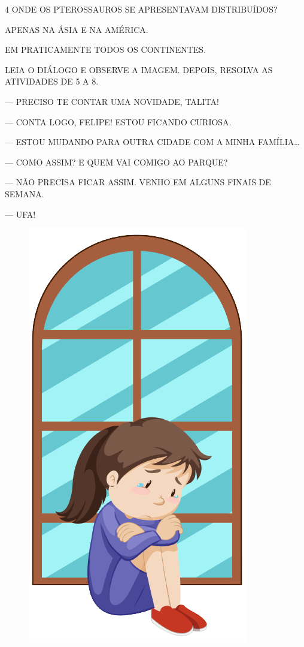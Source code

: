 \num{4} ONDE OS PTEROSSAUROS SE APRESENTAVAM DISTRIBUÍDOS?

\begin{boxlist}
 APENAS NA ÁSIA E NA AMÉRICA.

 EM PRATICAMENTE TODOS OS CONTINENTES.
\end{boxlist}

LEIA O DIÁLOGO E OBSERVE A IMAGEM. DEPOIS, RESOLVA
AS ATIVIDADES DE 5 A 8.



\begin{minipage}{.7\textwidth}
\begin{myquote}
--- PRECISO TE CONTAR UMA NOVIDADE, TALITA!

--- CONTA LOGO, FELIPE! ESTOU FICANDO CURIOSA.

--- ESTOU MUDANDO PARA OUTRA CIDADE COM A MINHA FAMÍLIA\ldots{}

--- COMO ASSIM? E QUEM VAI COMIGO AO PARQUE?

--- NÃO PRECISA FICAR ASSIM. VENHO EM ALGUNS FINAIS DE SEMANA.

--- UFA!
\end{myquote}
\end{minipage}
\begin{minipage}{.5\textwidth}
\begin{figure}[H]
\includegraphics[width=.5\textwidth]{media/image173a.png}
\end{figure}
\end{minipage}

